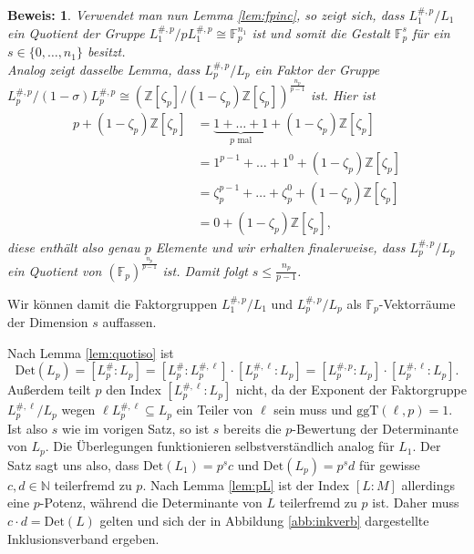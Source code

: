 \documentclass[12pt,a4paper,halfparskip,headsepline,bibtotocnumbered]{scrreprt}
\theoremstyle{nummermitklammern}
\theoremstyle{nonumberbreak}
\newtheorem{beweis}{Beweis:}
\newcommand{\N}{\mathbb{N}}
\newcommand{\Z}{\mathbb{Z}}
\newcommand{\F}{\mathbb{F}}
\newcommand{\Det}{\text{Det}}
\newcommand{\ggT}{\text{ggT}}
\begin{document}
\begin{beweis}
	Verwendet man nun Lemma \eqref{lem:fpinc}, so zeigt sich, dass $L_1^{\#, p} / L_1$ ein Quotient der Gruppe $L_1^{\#, p} / p L_1^{\#,p} \cong \F_p^{n_1}$ ist und somit die Gestalt $\F_p^s$ für ein $s \in \lbrace 0, \dots, n_1 \rbrace$ besitzt.\\
	Analog zeigt dasselbe Lemma, dass $L_p^{\#,p} / L_p$ ein Faktor der Gruppe $L_p^{\#,p} / (1 - \sigma) L_p^{\#,p} \cong (\Z\left[ \zeta_p \right] / (1 - \zeta_p) \Z\left[ \zeta_p \right])^\frac{n_p}{p-1}$ ist. Hier ist
	\begin{align*}
		p + (1 - \zeta_p) \Z\left[ \zeta_p \right] &= \underbrace{1 + \dots + 1}_{p \text{ mal}} + (1 - \zeta_p) \Z\left[ \zeta_p \right]\\
		&= 1^{p-1} + \dots + 1^0 + (1 - \zeta_p) \Z\left[ \zeta_p \right]\\
		 &= \zeta_p^{p-1} + \dots + \zeta_p^0 + (1 - \zeta_p) \Z\left[ \zeta_p \right]\\
		 &= 0 + (1 - \zeta_p) \Z\left[ \zeta_p \right],
	\end{align*}
	diese enthält also genau $p$ Elemente und wir erhalten finalerweise, dass $L_p^{\#, p} / L_p$ ein Quotient von $(\F_p)^\frac{n_p}{p-1}$ ist. Damit folgt $s \leq \frac{n_p}{p-1}$.
\end{beweis}


Wir können damit die Faktorgruppen $L_1^{\#,p} / L_1$ und $L_p^{\#,p} / L_p$ als $\F_p$-Vektorräume der Dimension $s$ auffassen.\par
Nach Lemma \eqref{lem:quotiso} ist
\begin{equation*}
	\Det(L_p) = \left[ L_p^\# : L_p \right] = \left[ L_p^\# : L_p^{\#,\ell} \right] \cdot \left[ L_p^{\#, \ell} : L_p \right] = \left[ L_p^{\#,p} : L_p \right] \cdot \left[ L_p^{\#, \ell} : L_p \right].
\end{equation*}
Außerdem teilt $p$ den Index $\left[ L_p^{\#, \ell} : L_p \right]$ nicht, da der Exponent der Faktorgruppe $L_p^{\#, \ell} / L_p$ wegen $\ell L_p^{\#, \ell} \subseteq L_p$ ein Teiler von $\ell$ sein muss und $\ggT(\ell,p) = 1$. Ist also $s$ wie im vorigen Satz, so ist $s$ bereits die $p$-Bewertung der Determinante von $L_p$. Die Überlegungen funktionieren selbstverständlich analog für $L_1$. Der Satz sagt uns also, dass $\Det(L_1) = p^s c$ und $\Det(L_p) = p^s d$ für gewisse $c, d \in \N$ teilerfremd zu $p$. Nach Lemma \eqref{lem:pL} ist der Index $\left[ L : M \right]$ allerdings eine $p$-Potenz, während die Determinante von $L$ teilerfremd zu $p$ ist. Daher muss $c \cdot d = \Det(L)$ gelten und sich der in Abbildung \eqref{abb:inkverb} dargestellte Inklusionsverband ergeben.
\end{document}
